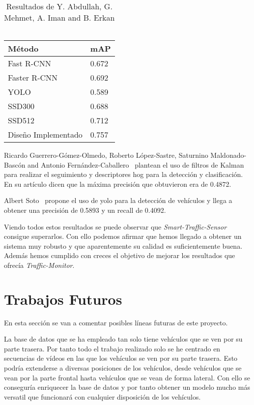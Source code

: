 \begin{table}[H] 
\begin{center}
\begin{tabular}{|l|l|}
\hline
Método & mAP  \\ 
\hline \hline
Fast R-CNN & 0.672  \\ \hline
Faster R-CNN & 0.692 \\ \hline
YOLO & 0.589  \\ \hline
SSD300  & 0.688 \\ \hline
SSD512  & 0.712 \\ \hline
Diseño Implementado & 0.757 \\ \hline
\end{tabular}
\caption{Resultados de Y. Abdullah, G. Mehmet, A. Iman and B. Erkan ~\cite{rcnn_detection}}
\label{resultados_lchen}
\end{center}
\end{table}

Ricardo Guerrero-Gómez-Olmedo, Roberto López-Sastre, Saturnino Maldonado-Bascón and Antonio Fernández-Caballero~\cite{gram-tracking} plantean el uso de filtros de Kalman para realizar el seguimiento y descriptores \acrshort{hog} para la detección y clasificación. En su artículo dicen que la máxima precisión que obtuvieron era de 0.4872.

Albert Soto~\cite{albert_soto} propone el uso de \acrshort{yolo} para la detección de vehículos y llega a obtener una precisión de 0.5893 y un recall de 0.4092.

Viendo todos estos resultados se puede observar que \textit{Smart-Traffic-Sensor} consigue superarlos. Con ello podemos afirmar que hemos llegado a obtener un sistema muy robusto y que aparentemente su calidad es suficientemente 
buena. Además hemos cumplido con creces el objetivo de mejorar los resultados que ofrecía \textit{Traffic-Monitor}.

\section{Trabajos Futuros}

En esta sección se van a comentar posibles líneas futuras de este proyecto.

La base de datos que se ha empleado tan solo tiene vehículos que se ven por su parte trasera. Por tanto todo el trabajo realizado solo se he centrado en secuencias de vídeos en las que los vehículos se ven por su parte trasera. Esto podría extenderse a diversas posiciones de los vehículos, desde vehículos que se vean por la parte frontal hasta vehículos que se vean de forma lateral. Con ello se conseguría enriquecer la base de  datos y por tanto obtener un modelo mucho más versatil que funcionará con cualquier disposición de los vehículos.


